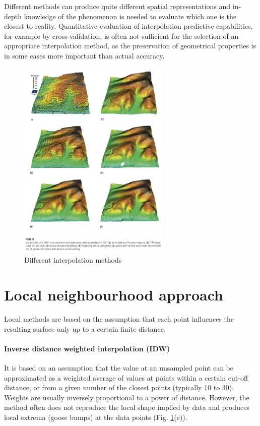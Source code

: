 \documentclass{article}
\begin{document}
Different methods can produce quite different spatial representations and in-depth knowledge of the phenomenon is needed to evaluate which one is the closest to reality. Quantitative evaluation of interpolation predictive capabilities, for example by cross-validation, is often not sufficient for the selection of an appropriate interpolation method, as the preservation of geometrical properties is in some cases more important than actual accuracy.

\begin{figure}[h!]
    \centering
    \includegraphics[width=0.65\textwidth]{img/interpolation.jpg}
    \caption{Different interpolation methods}
    \label{fig:my_label}
\end{figure}

\section{Local neighbourhood approach}
Local methods are based on the assumption that each point influences the resulting surface only up to a certain finite distance.
\paragraph{Inverse distance weighted interpolation (IDW)}
It is based on an assumption that the value at an unsampled point can be approximated as a weighted average of values at points within a certain cut-off distance, or from a given number of the closest points (typically 10 to 30). Weights are usually inversely proportional to a power of distance. However, the method often does not reproduce the local shape implied by data and produces local extrema (goose bumps) at the data points (Fig. \ref{fig:my_label}(c)).
\end{document}
